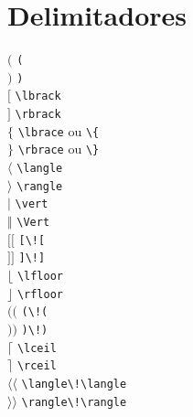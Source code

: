\documentclass{fei}
\begin{document}
\section{Delimitadores}
\begin{multicols}{3}
\noindent
\((\) \verb+(+\\
\()\) \verb+)+\\
\(\lbrack\) \verb+\lbrack+\\
\(\rbrack\) \verb+\rbrack+\\
\(\lbrace\) \verb+\lbrace+ ou \verb+\{+\\
\(\rbrace\) \verb+\rbrace+ ou \verb+\}+\\
\(\langle\) \verb+\langle+\\
\(\rangle\) \verb+\rangle+\\
\(\vert\) \verb+\vert+\\
\(\Vert\) \verb+\Vert+\\
\([\![\) \verb+[\![+\\
\(]\!]\) \verb+]\!]+\\
\(\lfloor\) \verb+\lfloor+\\
\(\rfloor\) \verb+\rfloor+\\
\((\!(\) \verb+(\!(+\\
\()\!)\) \verb+)\!)+\\
\(\lceil\) \verb+\lceil+\\
\(\rceil\) \verb+\rceil+\\
\(\langle\!\langle\) \verb+\langle\!\langle+\\
\(\rangle\!\rangle\) \verb+\rangle\!\rangle+\\
\end{multicols}
\end{document}
